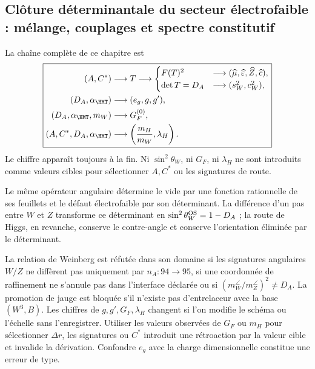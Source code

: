 \subsection{Clôture déterminantale du secteur électrofaible : mélange, couplages et spectre constitutif}

La chaîne complète de ce chapitre est
\begin{equation}
\label{rm:eq:ew-causal-diagram}
\boxed{
\begin{aligned}
(A,C^*)&\longrightarrow T
\longrightarrow
\begin{cases}
F(T)^2&\longrightarrow
(\widehat\mu,\widehat\varepsilon,\widehat Z,\widehat c),\\
\det T=D_A&\longrightarrow
(s_W^2,c_W^2),
\end{cases}\\
(D_A,\alpha_{\HMT})&\longrightarrow(e_g,g,g'),\\
(D_A,\alpha_{\HMT},m_W)&\longrightarrow G_F^{(0)},\\
(A,C^*,D_A,\alpha_{\HMT})&\longrightarrow
\left(\frac{m_H}{m_W},\lambda_H\right).
\end{aligned}}
\end{equation}
Le chiffre apparaît toujours à la fin. Ni \(\sin^2\theta_W\), ni
\(G_F\), ni \(\lambda_H\) ne sont introduits comme valeurs cibles pour sélectionner
\(A,C^*\) ou les signatures de route.

\begin{keyresult}
Le même opérateur angulaire détermine le vide par une fonction rationnelle
de ses feuillets et le défaut électrofaible par son déterminant. La
différence d'un pas entre \(W\) et \(Z\) transforme ce déterminant en
\(\sin^2\theta_W^{\rm OS}=1-D_A\) ; la route de Higgs, en revanche, conserve
le contre-angle et conserve l'orientation éliminée par le déterminant.
\end{keyresult}

\begin{falsifier}
La relation de Weinberg est réfutée dans son domaine si les signatures
angulaires \(W/Z\) ne diffèrent pas uniquement par \(n_A:94\to95\), si une coordonnée
de raffinement ne s'annule pas dans l'interface déclarée ou si
\((m_W^{\angle}/m_Z^{\angle})^2\neq D_A\). La promotion de jauge est
bloquée s'il n'existe pas d'entrelaceur avec la base \((W^3,B)\). Les chiffres
de \(g,g',G_F,\lambda_H\) changent si l'on modifie le schéma ou l'échelle sans
l'enregistrer. Utiliser les valeurs observées de \(G_F\) ou \(m_H\) pour sélectionner
\(\Delta r\), les signatures ou \(C^*\) introduit une rétroaction par la
valeur cible et invalide la dérivation. Confondre \(e_g\) avec la charge
dimensionnelle constitue une erreur de type.
\end{falsifier}


